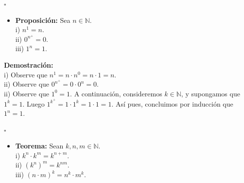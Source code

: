 \documentclass[10 pt]{article}
\begin{document}
\begin{flushright}
    $\square$
\end{flushright}

\begin{itemize}
    \item \Large{\textbf{Proposición:} Sea $n \in  \mathbb N$. \\

    i) $n^1=n$. \\

    ii) $0^{n^+}=0$. \\

    iii) $1^n=1$.} \\
\end{itemize}

\Large{\textbf{Demostración:} \\

i) Observe que $n^1=n \cdot n^0=n \cdot 1=n$. \\

ii) Observe que $0^{n^+}=0 \cdot 0^n=0$. \\

ii) Observe que $1^0=1$. A continuación, consideremos $k \in \mathbb N$, y supongamos que $1^k=1$. Luego $1^{k^+}=1 \cdot 1^k=1 \cdot 1=1$. Así pues, concluimos por inducción que $1^n=1$.} \\

\begin{flushright}
    $\square$
\end{flushright}

\begin{itemize}
    \item \Large{\textbf{Teorema:} Sean $k,n,m \in \mathbb N$. \\

    i) $k^n \cdot k^m=k^{n+m}$. \\

    ii) $(k^n)^m=k^{nm}$. \\

    iii) $(n \cdot m)^k=n^k \cdot m^k$.} \\
\end{itemize}
\end{document}
